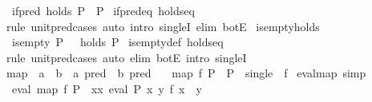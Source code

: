 \begin{isabellebody}
\ \ {\isachardoublequoteopen}if{\isacharunderscore}{\kern0pt}pred\ {\isacharparenleft}{\kern0pt}holds\ P{\isacharparenright}{\kern0pt}\ {\isacharequal}{\kern0pt}\ P{\isachardoublequoteclose}\isanewline
%
\isadelimproof
%
\endisadelimproof
%
\isatagproof
{}\isamarkupfalse%
\ if{\isacharunderscore}{\kern0pt}pred{\isacharunderscore}{\kern0pt}eq\ holds{\isacharunderscore}{\kern0pt}eq\isanewline
{}\isamarkupfalse%
\ {\isacharparenleft}{\kern0pt}rule\ unit{\isacharunderscore}{\kern0pt}pred{\isacharunderscore}{\kern0pt}cases{\isacharparenright}{\kern0pt}\ {\isacharparenleft}{\kern0pt}auto\ intro{\isacharcolon}{\kern0pt}\ singleI\ elim{\isacharcolon}{\kern0pt}\ botE{\isacharparenright}{\kern0pt}%
\endisatagproof
{\isafoldproof}%
%
\isadelimproof
\isanewline
%
\endisadelimproof
\isanewline
{}\isamarkupfalse%
\ is{\isacharunderscore}{\kern0pt}empty{\isacharunderscore}{\kern0pt}holds{\isacharcolon}{\kern0pt}\isanewline
\ \ {\isachardoublequoteopen}is{\isacharunderscore}{\kern0pt}empty\ P\ {\isasymlongleftrightarrow}\ {\isasymnot}\ holds\ P{\isachardoublequoteclose}\isanewline
%
\isadelimproof
%
\endisadelimproof
%
\isatagproof
{}\isamarkupfalse%
\ is{\isacharunderscore}{\kern0pt}empty{\isacharunderscore}{\kern0pt}def\ holds{\isacharunderscore}{\kern0pt}eq\isanewline
{}\isamarkupfalse%
\ {\isacharparenleft}{\kern0pt}rule\ unit{\isacharunderscore}{\kern0pt}pred{\isacharunderscore}{\kern0pt}cases{\isacharparenright}{\kern0pt}\ {\isacharparenleft}{\kern0pt}auto\ elim{\isacharcolon}{\kern0pt}\ botE\ intro{\isacharcolon}{\kern0pt}\ singleI{\isacharparenright}{\kern0pt}%
\endisatagproof
{\isafoldproof}%
%
\isadelimproof
\isanewline
%
\endisadelimproof
\isanewline
{}\isamarkupfalse%
\ map\ {\isacharcolon}{\kern0pt}{\isacharcolon}{\kern0pt}\ {\isachardoublequoteopen}{\isacharparenleft}{\kern0pt}{\isacharprime}{\kern0pt}a\ {\isasymRightarrow}\ {\isacharprime}{\kern0pt}b{\isacharparenright}{\kern0pt}\ {\isasymRightarrow}\ {\isacharprime}{\kern0pt}a\ pred\ {\isasymRightarrow}\ {\isacharprime}{\kern0pt}b\ pred{\isachardoublequoteclose}\ \isanewline
\ \ {\isachardoublequoteopen}map\ f\ P\ {\isacharequal}{\kern0pt}\ P\ {\isasymbind}\ {\isacharparenleft}{\kern0pt}single\ {\isasymcirc}\ f{\isacharparenright}{\kern0pt}{\isachardoublequoteclose}\isanewline
\isanewline
{}\isamarkupfalse%
\ eval{\isacharunderscore}{\kern0pt}map\ {\isacharbrackleft}{\kern0pt}simp{\isacharbrackright}{\kern0pt}{\isacharcolon}{\kern0pt}\isanewline
\ \ {\isachardoublequoteopen}eval\ {\isacharparenleft}{\kern0pt}map\ f\ P{\isacharparenright}{\kern0pt}\ {\isacharequal}{\kern0pt}\ {\isacharparenleft}{\kern0pt}{\isasymSqunion}x{\isasymin}{\isacharbraceleft}{\kern0pt}x{\isachardot}{\kern0pt}\ eval\ P\ x{\isacharbraceright}{\kern0pt}{\isachardot}{\kern0pt}\ {\isacharparenleft}{\kern0pt}{\isasymlambda}y{\isachardot}{\kern0pt}\ f\ x\ {\isacharequal}{\kern0pt}\ y{\isacharparenright}{\kern0pt}{\isacharparenright}{\kern0pt}{\isachardoublequoteclose}\isanewline

\end{isabellebody}

